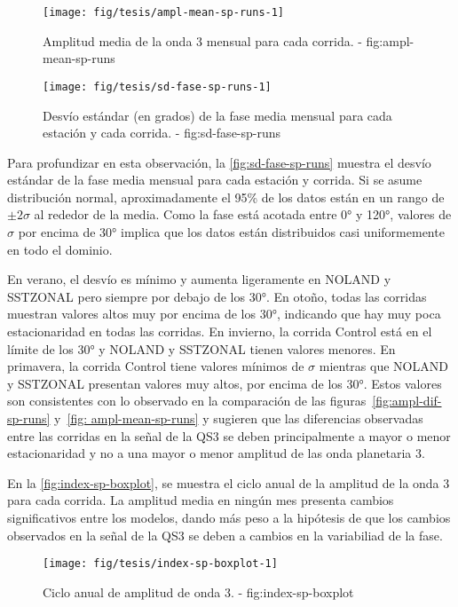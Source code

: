 \documentclass[spanish,a4paper]{book}
\begin{document}
\begin{figure*}
\texttt{[image: fig/tesis/ampl-mean-sp-runs-1]} \caption{Amplitud media de la onda 3 mensual para cada corrida. - fig:ampl-mean-sp-runs}\label{fig:ampl-mean-sp-runs}
\end{figure*}

\begin{figure*}
\texttt{[image: fig/tesis/sd-fase-sp-runs-1]} \caption{Desvío estándar (en grados) de la fase media mensual para cada estación y cada corrida. - fig:sd-fase-sp-runs}\label{fig:sd-fase-sp-runs}
\end{figure*}

Para profundizar en esta observación, la \autoref{fig:sd-fase-sp-runs}
muestra el desvío estándar de la fase media mensual para cada estación y
corrida. Si se asume distribución normal, aproximadamente el 95\% de los
datos están en un rango de \(\pm 2\sigma\) al rededor de la media. Como
la fase está acotada entre 0° y 120°, valores de \(\sigma\) por encima
de 30° implica que los datos están distribuidos casi uniformemente en
todo el dominio.

En verano, el desvío es mínimo y aumenta ligeramente en NOLAND y
SSTZONAL pero siempre por debajo de los 30°. En otoño, todas las
corridas muestran valores altos muy por encima de los 30°, indicando que
hay muy poca estacionaridad en todas las corridas. En invierno, la
corrida Control está en el límite de los 30° y NOLAND y SSTZONAL tienen
valores menores. En primavera, la corrida Control tiene valores mínimos
de \(\sigma\) mientras que NOLAND y SSTZONAL presentan valores muy
altos, por encima de los 30°. Estos valores son consistentes con lo
observado en la comparación de las figuras~\ref{fig:ampl-dif-sp-runs}
y~\ref{fig: ampl-mean-sp-runs} y sugieren que las diferencias observadas
entre las corridas en la señal de la QS3 se deben principalmente a mayor
o menor estacionaridad y no a una mayor o menor amplitud de las onda
planetaria 3.

En la \autoref{fig:index-sp-boxplot}, se muestra el ciclo anual de la
amplitud de la onda 3 para cada corrida. La amplitud media en ningún mes
presenta cambios significativos entre los modelos, dando más peso a la
hipótesis de que los cambios observados en la señal de la QS3 se deben a
cambios en la variabiliad de la fase.

\begin{figure*}
\texttt{[image: fig/tesis/index-sp-boxplot-1]} \caption{Ciclo anual de amplitud de onda 3. - fig:index-sp-boxplot}\label{fig:index-sp-boxplot}
\end{figure*}
\end{document}
